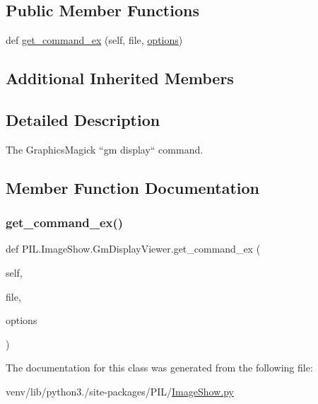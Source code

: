 \subsection*{Public Member Functions}
\begin{DoxyCompactItemize}
\item 
def \hyperlink{classPIL_1_1ImageShow_1_1GmDisplayViewer_a4d2f04170813968627d0f96b5def7f32}{get\+\_\+command\+\_\+ex} (self, file, \hyperlink{classPIL_1_1ImageShow_1_1UnixViewer_afbac95ff1c2d0ab0858163dd7e80671e}{options})
\end{DoxyCompactItemize}
\subsection*{Additional Inherited Members}


\subsection{Detailed Description}
\begin{DoxyVerb}The GraphicsMagick ``gm display`` command.\end{DoxyVerb}
 

\subsection{Member Function Documentation}
\mbox{\label{classPIL_1_1ImageShow_1_1GmDisplayViewer_a4d2f04170813968627d0f96b5def7f32}} 
\subsubsection{\texorpdfstring{get\+\_\+command\+\_\+ex()}{get\_command\_ex()}}
{\footnotesize\ttfamily def P\+I\+L.\+Image\+Show.\+Gm\+Display\+Viewer.\+get\+\_\+command\+\_\+ex (\begin{DoxyParamCaption}\item[{}]{self,  }\item[{}]{file,  }\item[{}]{options }\end{DoxyParamCaption})}



The documentation for this class was generated from the following file\+:\begin{DoxyCompactItemize}
\item 
venv/lib/python3./site-\/packages/\+P\+I\+L/\hyperlink{ImageShow_8py}{Image\+Show.\+py}\end{DoxyCompactItemize}
